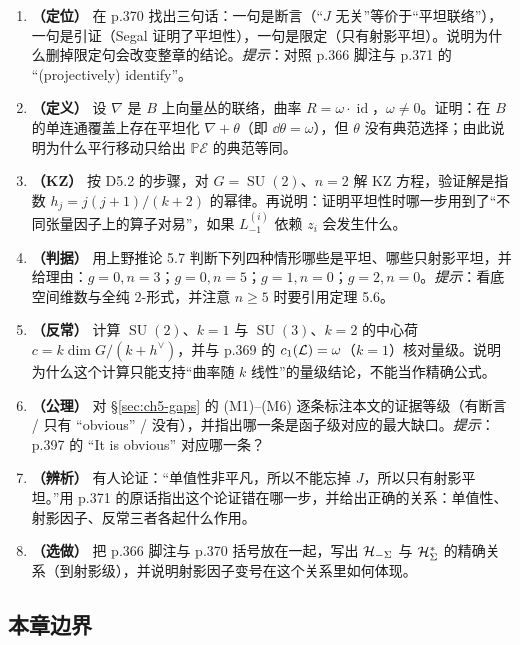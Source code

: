 \begin{enumerate}[leftmargin=1.8em,itemsep=3pt]
\item \textbf{（定位）} 在 p.370 找出三句话：一句是断言（“$J$ 无关”等价于“平坦联络”），一句是引证（Segal 证明了平坦性），一句是限定（只有射影平坦）。说明为什么删掉限定句会改变整章的结论。\emph{提示}：对照 p.366 脚注与 p.371 的 “(projectively) identify”。
\item \textbf{（定义）} 设 $\nabla$ 是 $B$ 上向量丛的联络，曲率 $R=\omega\cdot\operatorname{id}$，$\omega\neq0$。证明：在 $B$ 的单连通覆盖上存在平坦化 $\nabla+\theta$（即 $\dd\theta=\omega$），但 $\theta$ 没有典范选择；由此说明为什么平行移动只给出 $\mathbb P\mathcal{E}$ 的典范等同。
\item \textbf{（KZ）} 按 D5.2 的步骤，对 $G=\operatorname{SU}(2)$、$n=2$ 解 KZ 方程，验证解是指数 $h_j=j(j+1)/(k+2)$ 的幂律。再说明：证明平坦性时哪一步用到了“不同张量因子上的算子对易”，如果 $L^{(i)}_{-1}$ 依赖 $z_i$ 会发生什么。
\item \textbf{（判据）} 用上野推论 5.7 判断下列四种情形哪些是平坦、哪些只射影平坦，并给理由：$g=0,n=3$；$g=0,n=5$；$g=1,n=0$；$g=2,n=0$。\emph{提示}：看底空间维数与全纯 $2$-形式，并注意 $n\ge5$ 时要引用定理 5.6。
\item \textbf{（反常）} 计算 $\operatorname{SU}(2)$、$k=1$ 与 $\operatorname{SU}(3)$、$k=2$ 的中心荷 $c=k\dim G/(k+h^\vee)$，并与 p.369 的 $c_1(\mathcal{L})=\omega$（$k=1$）核对量级。说明为什么这个计算只能支持“曲率随 $k$ 线性”的量级结论，不能当作精确公式。
\item \textbf{（公理）} 对 \S\ref{sec:ch5-gaps} 的 (M1)--(M6) 逐条标注本文的证据等级（有断言 / 只有 “obvious” / 没有），并指出哪一条是函子级对应的最大缺口。\emph{提示}：p.397 的 “It is obvious” 对应哪一条？
\item \textbf{（辨析）} 有人论证：“单值性非平凡，所以不能忘掉 $J$，所以只有射影平坦。”用 p.371 的原话指出这个论证错在哪一步，并给出正确的关系：单值性、射影因子、反常三者各起什么作用。
\item \textbf{（选做）} 把 p.366 脚注与 p.370 括号放在一起，写出 $\mathcal{H}_{-\Sigma}$ 与 $\mathcal{H}_\Sigma^{*}$ 的精确关系（到射影级），并说明射影因子变号在这个关系里如何体现。
\end{enumerate}

\subsection{本章边界}
\label{sec:ch5-boundary}

